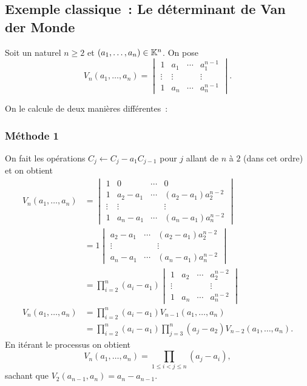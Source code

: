 \subsection{Exemple classique~: Le déterminant de Van der Monde}

Soit un naturel \(n \geqslant 2\) et \((a_1, \ldots, a_n) \in \mathbb{K}^n\). On
pose
\begin{equation}
  V_n(a_1, \ldots, a_n) =
  \begin{vmatrix}
    1 & a_1 & \cdots & a_1^{n-1} \\
    \vdots & \vdots &  & \vdots \\
    1 & a_n & \cdots & a_n^{n-1}
  \end{vmatrix}.
\end{equation}

On le calcule de deux manières différentes~:

\subsubsection{Méthode 1}

On fait les opérations \( C_j \leftarrow C_j - a_1C_{j-1}\) pour \(j\)
allant de \(n\) à \(2\) (dans cet ordre) et on obtient
\begin{align}
  V_n(a_1, \ldots, a_n) &=
  \begin{vmatrix}
    1 & 0 & \cdots & 0 \\
    1 & a_2-a_1 & \cdots & (a_2-a_1)a_2^{n-2} \\
    \vdots & \vdots &  & \vdots \\
    1 & a_n-a_1 & \cdots & (a_n-a_1)a_n^{n-2}
  \end{vmatrix}\\
  &=1
  \begin{vmatrix}
    a_2-a_1 & \cdots & (a_2-a_1)a_2^{n-2} \\
    \vdots &  & \vdots \\
    a_n-a_1 & \cdots & (a_n-a_1)a_n^{n-2}
  \end{vmatrix}\\
  &=\prod_{i=2}^n(a_i-a_1)
  \begin{vmatrix}
    1 & a_2 &\cdots & a_2^{n-2} \\
    \vdots & & & \vdots \\
    1 & a_n &\cdots & a_n^{n-2}
  \end{vmatrix}\\
  V_n(a_1, \ldots, a_n)  &=\prod_{i=2}^n(a_i-a_1) V_{n-1}(a_1, \ldots, a_n) \\
  &=\prod_{i=2}^n(a_i-a_1) \prod_{j=3}^n(a_j-a_2) V_{n-2}(a_1, \ldots, a_n).
\end{align}
En itérant le processus on obtient
\begin{equation}
  V_n(a_1, \ldots, a_n) = \prod_{1 \le i < j \leqslant n} (a_j-a_i),
\end{equation}
sachant que \(V_2(a_{n-1},a_n)=a_n-a_{n-1}\).


